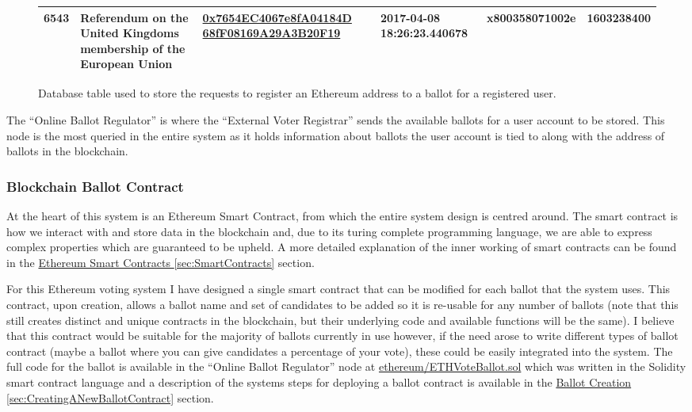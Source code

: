 \documentclass{article}
\begin{document}
\begin{figure}[h]
{\begin{tabular}{ | l | p{4cm} | p{4cm} | p{2.5cm} | p{2.5cm} | l |}
    		6543 & Referendum on the United Kingdoms membership of the European Union & \href{https://etherscan.io/address/0x7654EC4067e8fA04184D68fF08169A29A3B20F19}{0x7654EC4067e8fA04184D
    		68fF08169A29A3B20F19} & 2017-04-08 18:26:23.440678 & x800358071002e & 1603238400  \\ \hline 		
    		
    	\end{tabular}
  	}%
    
	\caption{Database table used to store the requests to register an Ethereum address to a ballot for a registered user.}
\end{figure}

The ``Online Ballot Regulator'' is where the ``External Voter Registrar'' sends the available ballots for a user account to be stored. This node is the most queried in the entire system as it holds information about ballots the user account is tied to along with the address of ballots in the blockchain.

\subsubsection{Blockchain Ballot Contract}
\label{sec:BlockchainBallotContract}
At the heart of this system is an Ethereum Smart Contract, from which the entire system design is centred around. The smart contract is how we interact with and store data in the blockchain and, due to its turing complete programming language, we are able to express complex properties which are guaranteed to be upheld. A more detailed explanation of the inner working of smart contracts can be found in the \hyperref[sec:SmartContracts]{Ethereum Smart Contracts \ref*{sec:SmartContracts}} section.

For this Ethereum voting system I have designed a single smart contract that can be modified for each ballot that the system uses. This contract, upon creation, allows a ballot name and set of candidates to be added so it is re-usable for any number of ballots (note that this still creates distinct and unique contracts in the blockchain, but their underlying code and available functions will be the same). I believe that this contract would be suitable for the majority of ballots currently in use however, if the need arose to write different types of ballot contract (maybe a ballot where you can give candidates a percentage of your vote), these could be easily integrated into the system. The full code for the ballot is available in the ``Online Ballot Regulator'' node at \href{https://github.com/Mattie432/Blockchain-Voting-System/blob/master/Programming/4_OnlineBallotRegulator/ethereum/ETHVoteBallot.sol}{ethereum/ETHVoteBallot.sol} which was written in the Solidity smart contract language and a description of the systems steps for deploying a ballot contract is available in the \hyperref[sec:CreatingANewBallotContract]{Ballot Creation \ref*{sec:CreatingANewBallotContract}} section. 
\end{document}
